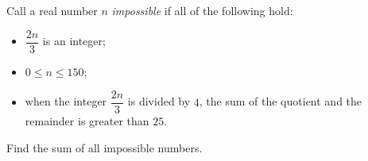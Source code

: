 Call a real number $n$ \emph{impossible} if all of the following hold:
\begin{itemize}
\item $\dfrac{2n}{3}$ is an integer;
\item $0\le n\le150$;
\item when the integer $\dfrac{2n}{3}$ is divided by $4$, the sum of the quotient and the remainder is greater than $25$.
\end{itemize}
Find the sum of all impossible numbers.
